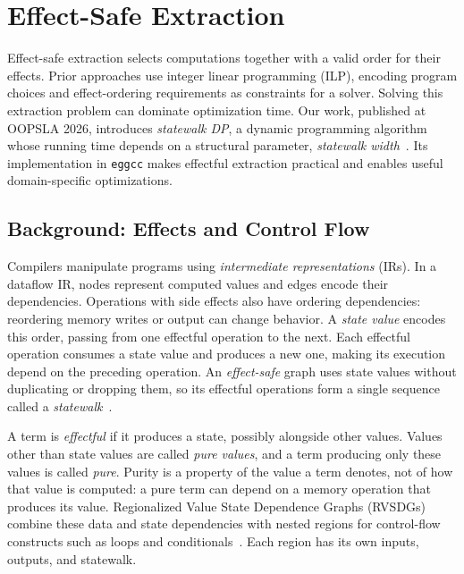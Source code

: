 \section{Effect-Safe Extraction}
\label{sec:effectful-extraction}

Effect-safe extraction selects computations together with a valid order for their effects.
Prior approaches use integer linear programming (ILP),
  encoding program choices and effect-ordering requirements as constraints for a solver.
Solving this extraction problem can dominate optimization time.
Our work, published at OOPSLA 2026, introduces \emph{statewalk DP},
  a dynamic programming algorithm whose running time depends on a structural parameter,
  \emph{statewalk width}~\cite{eggcc}.
Its implementation in \texttt{eggcc} makes effectful extraction practical
  and enables useful domain-specific optimizations.

\subsection{Background: Effects and Control Flow}
\label{sec:background-effects}

Compilers manipulate programs using \emph{intermediate representations} (IRs).
In a dataflow IR, nodes represent computed values and edges encode their dependencies.
Operations with side effects also have ordering dependencies:
  reordering memory writes or output can change behavior.
A \emph{state value} encodes this order, passing from one effectful operation to the next.
Each effectful operation consumes a state value and produces a new one,
  making its execution depend on the preceding operation.
An \emph{effect-safe} graph uses state values without duplicating or dropping them,
  so its effectful operations form a single sequence called a \emph{statewalk}~\cite{eggcc}.

A term is \emph{effectful} if it produces a state, possibly alongside other values.
Values other than state values are called \emph{pure values},
  and a term producing only these values is called \emph{pure}.
Purity is a property of the value a term denotes, not of how that value is computed:
  a pure term can depend on a memory operation that produces its value.
Regionalized Value State Dependence Graphs (RVSDGs) combine these data and state dependencies
  with nested regions for control-flow constructs such as loops and conditionals~\cite{rvsdg}.
Each region has its own inputs, outputs, and statewalk.

